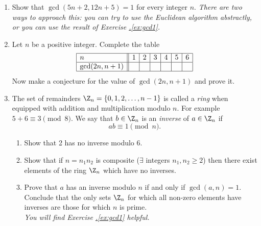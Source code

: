 \begin{enumerate}
  \item Show that $\gcd(5n+2,12n+5)=1$ for every integer $n$. \emph{There are two ways to approach this: you can try to use the Euclidean algorithm abstractly, or you can use the result of Exercise \hyperref[ex:gcd1]{\thesubsection.\ref*{ex:gcd1}}.}
  
  \item Let $n$ be a positive integer. Complete the table
  \[\begin{array}{|l||c|c|c|c|c|c|}
  \hline
  n&1&2&3&4&5&6\\\hline
  \gcd(2n,n+1)&&&&&&\\\hline
  \end{array}\]
  Now make a conjecture for the value of $\gcd(2n,n+1)$ and prove it.
  
  \item The set of remainders $\Z_n=\{0,1,2,\ldots,n-1\}$ is called a \emph{ring} when equipped with addition and multiplication modulo $n$. For example $5+6\equiv 3\pmod{8}$. We say that $b\in\Z_n$ is an \emph{inverse} of $a\in\Z_n$ if
	\[ab\equiv 1\pmod n.\]
	\begin{enumerate}
	  \item Show that 2 has no inverse modulo 6.
	  \item Show that if $n=n_1n_2$ is composite ($\exists$ integers $n_1,n_2\ge 2$) then there exist elements of the ring $\Z_n$ which have no inverses.
	  \item Prove that $a$ has an inverse modulo $n$ if and only if $\gcd(a,n)=1$. Conclude that the only sets $\Z_n$ for which all non-zero elements have inverses are those for which $n$ is prime.\\
	  \emph{You will find Exercise \hyperref[ex:gcd1]{\thesubsection.\ref*{ex:gcd1}} helpful.}
	\end{enumerate}
\end{enumerate}